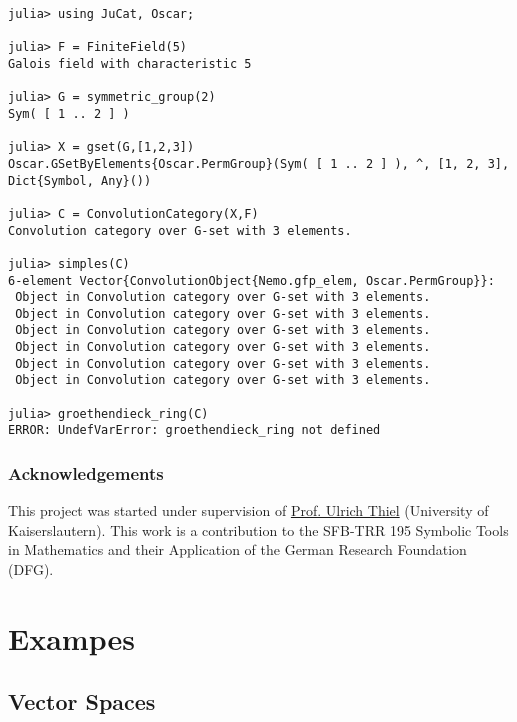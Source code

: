 \documentclass{memoir}
\begin{document}
\begin{verbatim}
julia> using JuCat, Oscar;

julia> F = FiniteField(5)
Galois field with characteristic 5

julia> G = symmetric_group(2)
Sym( [ 1 .. 2 ] )

julia> X = gset(G,[1,2,3])
Oscar.GSetByElements{Oscar.PermGroup}(Sym( [ 1 .. 2 ] ), ^, [1, 2, 3], Dict{Symbol, Any}())

julia> C = ConvolutionCategory(X,F)
Convolution category over G-set with 3 elements.

julia> simples(C)
6-element Vector{ConvolutionObject{Nemo.gfp_elem, Oscar.PermGroup}}:
 Object in Convolution category over G-set with 3 elements.
 Object in Convolution category over G-set with 3 elements.
 Object in Convolution category over G-set with 3 elements.
 Object in Convolution category over G-set with 3 elements.
 Object in Convolution category over G-set with 3 elements.
 Object in Convolution category over G-set with 3 elements.

julia> groethendieck_ring(C)
ERROR: UndefVarError: groethendieck_ring not defined
\end{verbatim}



\hypertarget{13308868583318588695}{}


\section{Acknowledgements}



This project was started under supervision of \href{https://ulthiel.com/math/}{Prof. Ulrich Thiel}  (University of Kaiserslautern). This work is a contribution to the SFB-TRR 195 {\textquotesingle}Symbolic Tools in Mathematics and their Application{\textquotesingle} of the German Research Foundation (DFG).



\part{Exampes}


\chapter{Vector Spaces}






\hypertarget{3925623155951375781}{}
\end{document}

